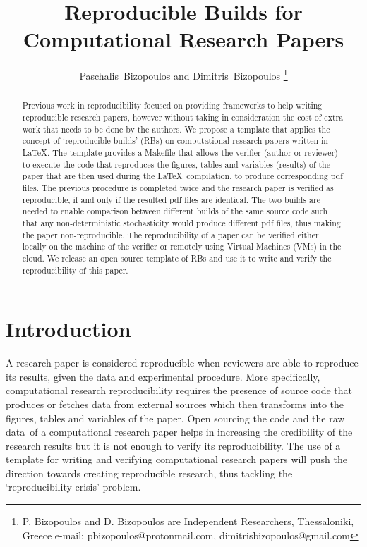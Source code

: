 \documentclass[journal]{IEEEtran}
\begin{document}

\title{Reproducible Builds for\\ Computational Research Papers}

\author{Paschalis~Bizopoulos and Dimitris~Bizopoulos
\thanks{P. Bizopoulos and D. Bizopoulos are Independent Researchers, Thessaloniki, Greece e-mail: pbizopoulos@protonmail.com, dimitrisbizopoulos@gmail.com}}

\maketitle

\begin{abstract}
	Previous work in reproducibility focused on providing frameworks to help writing reproducible research papers, however without taking in consideration the cost of extra work that needs to be done by the authors.
	We propose a template that applies the concept of `reproducible builds' (RBs) on computational research papers written in \LaTeX.
	The template provides a Makefile that allows the verifier (author or reviewer) to execute the code that reproduces the figures, tables and variables (results) of the paper that are then used during the \LaTeX\ compilation, to produce corresponding pdf files.
	The previous procedure is completed twice and the research paper is verified as reproducible, if and only if the resulted pdf files are identical.
	The two builds are needed to enable comparison between different builds of the same source code such that any non-deterministic stochasticity would produce different pdf files, thus making the paper non-reproducible.
	The reproducibility of a paper can be verified either locally on the machine of the verifier or remotely using Virtual Machines (VMs) in the cloud.
	We release an open source template of RBs and use it to write and verify the reproducibility of this paper.
\end{abstract}

\section{Introduction}
A research paper is considered reproducible when reviewers are able to reproduce its results, given the data and experimental procedure.
More specifically, computational research reproducibility requires the presence of source code that produces or fetches data from external sources which then transforms into the figures, tables and variables of the paper.
Open sourcing the code and the raw data of a computational research paper helps in increasing the credibility of the research results but it is not enough to verify its reproducibility.
The use of a template for writing and verifying computational research papers will push the direction towards creating reproducible research, thus tackling the `reproducibility crisis' problem.
\end{document}
